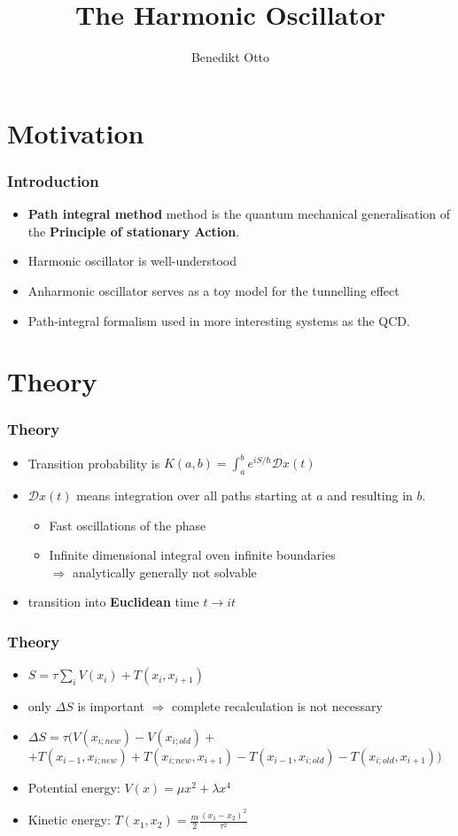 \documentclass[aspectratio=169]{beamer}
\title[The Harmonic Oscillator]{The Harmonic Oscillator}
\author{Benedikt Otto}
\date{\printdate{31.03.2020}}
\institute{physics760: Computational Physics}
\begin{document}
\begin{frame}
	\titlepage
\end{frame}


\section{Motivation}
\begin{frame}
	\frametitle{Introduction}
	\begin{itemize}
		\item \textbf{Path integral method} method is the quantum mechanical generalisation of the \textbf{Principle of stationary Action}.
		\item Harmonic oscillator is well-understood
		\item Anharmonic oscillator serves as a toy model for the tunnelling effect
		\item Path-integral formalism used in more interesting systems as the QCD.
	\end{itemize}
\end{frame}

\section{Theory}
\begin{frame}
	\frametitle{Theory}
	\begin{itemize}
		\item Transition probability is $K(a, b) = \int_a^b e^{iS/\hbar} \mathcal Dx(t)$
		\item $\mathcal Dx(t)$ means integration over all paths starting at $a$ and resulting in $b$.
		\begin{itemize}
			\item Fast oscillations of the phase
			\item Infinite dimensional integral oven infinite boundaries
			\\ $\Rightarrow$ analytically generally not solvable
		\end{itemize}
		\item transition into \textbf{Euclidean} time $t \rightarrow it$
	\end{itemize}
\end{frame}

\begin{frame}
	\frametitle{Theory}
	\begin{itemize}
		\item $S = \tau \sum_i {V(x_i) + T(x_i, x_{i+1})}$
		\item only $\Delta S$ is important $\Rightarrow$ complete recalculation is not necessary
		\item $\Delta S = \tau (V(x_{i;new}) - V(x_{i;old}) + $\\$ + T(x_{i-1}, x_{i;new}) + T(x_{i;new}, x_{i+1}) - T(x_{i-1}, x_{i;old}) - T(x_{i;old}, x_{i+1}))$
		\item Potential energy: $V(x) = \mu x^2 + \lambda x^4$
		\item Kinetic energy: $T(x_1, x_2) = \frac m2 \frac{(x_1 - x_2)^2}{\tau^2}$
	\end{itemize}
\end{frame}
\end{document}
